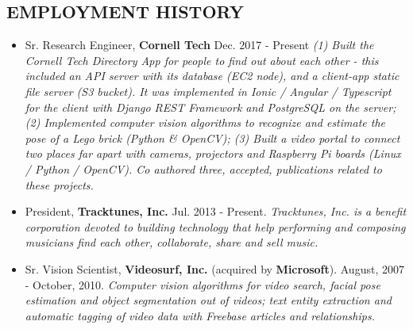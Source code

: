 \documentclass[conference,lettersize,twocolumn,twosize]{./IEEEtran}
\begin{document}
\subsection*{EMPLOYMENT HISTORY}
\begin{center}
  \begin{itemize}
  \item{Sr. Research Engineer, {\bf Cornell Tech} Dec. 2017 - Present
    \emph{(1) Built the Cornell Tech Directory App for people to find
      out about each other - this included an API server with its
      database (EC2 node), and a client-app static file server (S3
      bucket). It was implemented in Ionic / Angular / Typescript for
      the client with Django REST Framework and PostgreSQL on the
      server; (2) Implemented computer vision algorithms to recognize
      and estimate the pose of a Lego brick (Python \& OpenCV); (3)
      Built a video portal to connect two places far apart with
      cameras, projectors and Raspberry Pi boards (Linux / Python /
      OpenCV). Co authored three, accepted, publications related to
      these projects.}}
  \item{President, {\bf Tracktunes, Inc.} Jul. 2013 - Present.  \emph{
      Tracktunes, Inc. is a benefit corporation devoted to building
      technology that help performing and composing musicians find
      each other, collaborate, share and sell music. }}
  \item{Sr. Vision Scientist, {\bf Videosurf, Inc.}  (acquired by \bf
    Microsoft}). August, 2007 - October, 2010.  \emph{Computer vision
    algorithms for video search, facial pose estimation and object
    segmentation out of videos; text entity extraction and automatic
    tagging of video data with Freebase articles and relationships.}


\end{itemize}
\end{center}
\end{document}

